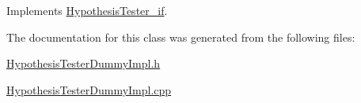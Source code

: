 Implements \hyperlink{class_hypothesis_tester__if_ad2360392ccf3858da38092448152c33d}{Hypothesis\+Tester\+\_\+if}.



The documentation for this class was generated from the following files\+:\begin{DoxyCompactItemize}
\item 
\hyperlink{_hypothesis_tester_dummy_impl_8h}{Hypothesis\+Tester\+Dummy\+Impl.\+h}\item 
\hyperlink{_hypothesis_tester_dummy_impl_8cpp}{Hypothesis\+Tester\+Dummy\+Impl.\+cpp}\end{DoxyCompactItemize}
